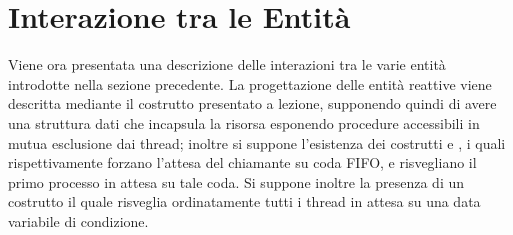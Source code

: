 \section{Interazione tra le Entità}

Viene ora presentata una descrizione delle interazioni tra le varie entità introdotte nella sezione precedente. La progettazione delle entità reattive viene descritta mediante il costrutto  presentato a lezione, supponendo quindi di avere una struttura dati che incapsula la risorsa esponendo procedure accessibili in mutua esclusione dai thread; inoltre si suppone l'esistenza dei costrutti  e , i quali rispettivamente forzano l'attesa del chiamante su coda FIFO, e risvegliano il primo processo in attesa su tale coda. Si suppone inoltre la presenza di un costrutto  il quale risveglia ordinatamente tutti i thread in attesa su una data variabile di condizione.







